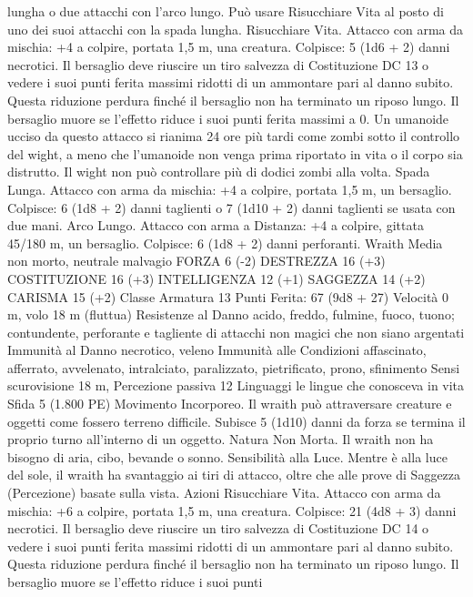 \begin{multicols}{2}
lungha o due attacchi con l’arco lungo. Può usare Risucchiare
Vita al posto di uno dei suoi attacchi con la spada lungha.
Risucchiare Vita. Attacco con arma da mischia: +4 a colpire,
portata 1,5 m, una creatura.
Colpisce: 5 (1d6 + 2) danni necrotici. Il bersaglio deve riuscire
un tiro salvezza di Costituzione DC 13 o vedere i suoi punti
ferita massimi ridotti di un ammontare pari al danno subito.
Questa riduzione perdura finché il bersaglio non ha terminato un
riposo lungo. Il bersaglio muore se l’effetto riduce i suoi punti
ferita massimi a 0.
Un umanoide ucciso da questo attacco si rianima 24 ore più tardi
come zombi sotto il controllo del wight, a meno che l’umanoide
non venga prima riportato in vita o il corpo sia distrutto. Il wight
non può controllare più di dodici zombi alla volta.
Spada Lunga. Attacco con arma da mischia: +4 a colpire,
portata 1,5 m, un bersaglio.
Colpisce: 6 (1d8 + 2) danni taglienti o 7 (1d10 + 2) danni
taglienti se usata con due mani.
Arco Lungo. Attacco con arma a Distanza: +4 a colpire, gittata
45/180 m, un bersaglio.
Colpisce: 6 (1d8 + 2) danni perforanti.
Wraith
Media non morto, neutrale malvagio
FORZA 6 (-2)
DESTREZZA 16 (+3)
COSTITUZIONE 16 (+3)
INTELLIGENZA 12 (+1)
SAGGEZZA 14 (+2)
CARISMA 15 (+2)
Classe Armatura 13
\hspace*{0pt}\hfill{Punti Ferita}: 67 (9d8 + 27)
Velocità 0 m, volo 18 m (fluttua)
Resistenze al Danno acido, freddo, fulmine, fuoco, tuono;
contundente, perforante e tagliente di attacchi non magici che
non siano argentati
Immunità al Danno necrotico, veleno
Immunità alle Condizioni affascinato, afferrato, avvelenato,
intralciato, paralizzato, pietrificato, prono, sfinimento
Sensi scurovisione 18 m, Percezione passiva 12
Linguaggi le lingue che conosceva in vita
Sfida 5 (1.800 PE)
Movimento Incorporeo. Il wraith può attraversare creature e
oggetti come fossero terreno difficile. Subisce 5 (1d10) danni da
forza se termina il proprio turno all’interno di un oggetto.
Natura Non Morta. Il wraith non ha bisogno di aria, cibo,
bevande o sonno.
Sensibilità alla Luce. Mentre è alla luce del sole, il wraith ha
svantaggio ai tiri di attacco, oltre che alle prove di Saggezza
(Percezione) basate sulla vista.
Azioni
Risucchiare Vita. Attacco con arma da mischia: +6 a colpire,
portata 1,5 m, una creatura.
Colpisce: 21 (4d8 + 3) danni necrotici. Il bersaglio deve riuscire
un tiro salvezza di Costituzione DC 14 o vedere i suoi punti
ferita massimi ridotti di un ammontare pari al danno subito.
Questa riduzione perdura finché il bersaglio non ha terminato un
riposo lungo. Il bersaglio muore se l’effetto riduce i suoi punti

\end{multicols}
